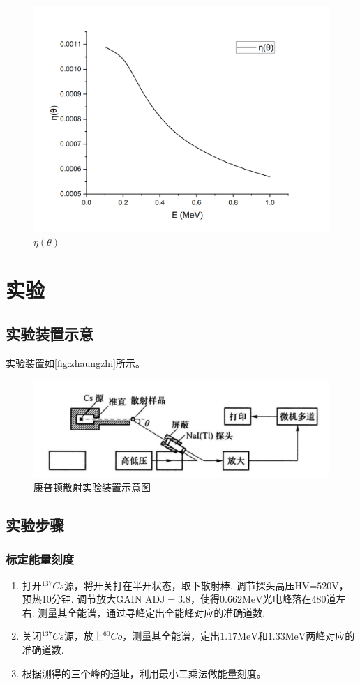 \documentclass[font=default]{mpltx}
\begin{document}
\begin{figure}[htbp]
  \centering
  \includegraphics[width=0.85\linewidth]{fig/yita.png}
  \caption{$\eta(\theta)$}
  \label{fig:eta}
\end{figure}

\section{实验}
\subsection{实验装置示意}
实验装置如\autoref{fig:zhaungzhi}所示。

\begin{figure}[htbp]
  \centering
  \includegraphics[width=0.85\linewidth]{fig/zhuangzhi.png}
  \caption{康普顿散射实验装置示意图}
  \label{fig:zhaungzhi}
\end{figure}


\subsection{实验步骤}
  \subsubsection{标定能量刻度}
    \begin{enumerate}
      \item 打开${^{137}Cs}$源，将开关打在半开状态，取下散射棒. 调节探头高压$\text{HV=520V}$，预热10分钟. 调节放大$\text{GAIN ADJ} = 3.8$，使得$0.662\text{MeV}$光电峰落在480道左右. 测量其全能谱，通过寻峰定出全能峰对应的准确道数.
      \item 关闭${^{137}Cs}$源，放上${^{60}Co}$，测量其全能谱，定出$1.17\text{MeV}$和$1.33\text{MeV}$两峰对应的准确道数.
      \item 根据测得的三个峰的道址，利用最小二乘法做能量刻度。
    \end{enumerate}
\end{document}
